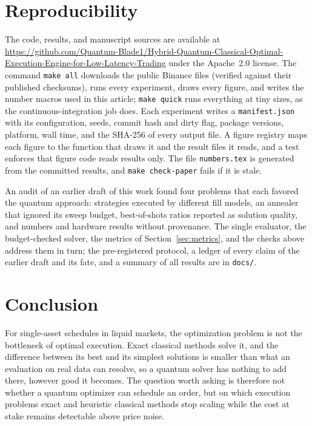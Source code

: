 \documentclass[journal]{IEEEtran}
\begin{document}
\section{Reproducibility}
\label{sec:repro}

The code, results, and manuscript sources are available at
\url{https://github.com/Quantum-Blade1/Hybrid-Quantum-Classical-Optimal-Execution-Engine-for-Low-Latency-Trading}
under the Apache~2.0 license. The command \texttt{make all} downloads the public Binance
files (verified against their published checksums), runs every experiment, draws every
figure, and writes the number macros used in this article; \texttt{make quick} runs
everything at tiny sizes, as the continuous-integration job does. Each experiment writes a
\texttt{manifest.json} with its configuration, seeds, commit hash and dirty flag, package
versions, platform, wall time, and the SHA-256 of every output file. A figure registry maps
each figure to the function that draws it and the result files it reads, and a test enforces
that figure code reads results only. The file \texttt{numbers.tex} is generated from the
committed results, and \texttt{make check-paper} fails if it is stale.

An audit of an earlier draft of this work found four problems that each favored the quantum
approach: strategies executed by different fill models, an annealer that ignored its sweep
budget, best-of-shots ratios reported as solution quality, and numbers and hardware results
without provenance. The single evaluator, the budget-checked solver, the metrics of
Section~\ref{sec:metrics}, and the checks above address them in turn; the pre-registered
protocol, a ledger of every claim of the earlier draft and its fate, and a summary of all
results are in \texttt{docs/}.

\section{Conclusion}
\label{sec:conclusion}

For single-asset schedules in liquid markets, the optimization problem is not the
bottleneck of optimal execution. Exact classical methods solve it, and the difference
between its best and its simplest solutions is smaller than what an evaluation on real data
can resolve, so a quantum solver has nothing to add there, however good it becomes. The
question worth asking is therefore not whether a quantum optimizer can schedule an order,
but on which execution problems exact and heuristic classical methods stop scaling while the
cost at stake remains detectable above price noise.
\end{document}

